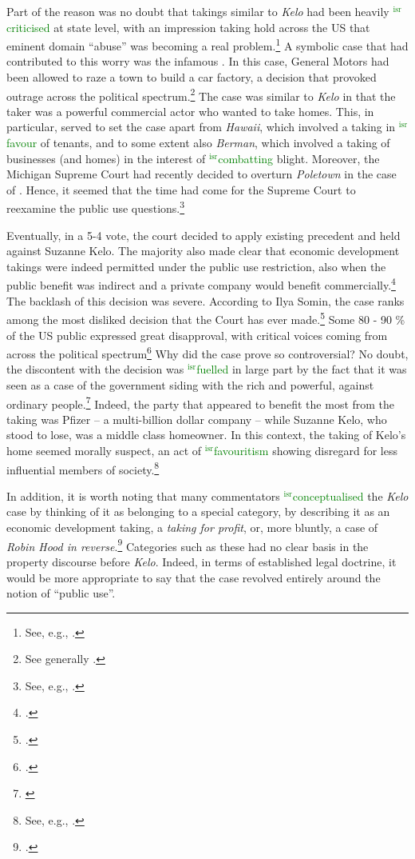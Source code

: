 \documentclass[12pt,a4paper]{book} %
\newcommand{\isr}[1]{\textcolor{green}{$^{\textrm{isr}}${#1}}}
\begin{document}
Part of the reason was no doubt that takings similar to {\it Kelo} had been heavily \isr{criticised} at state level, with an impression taking hold across the US that eminent domain ``abuse'' was becoming a real problem.\footnote{See, e.g., \cite[667-669]{sandefur05}.} A symbolic case that had contributed to this worry was the infamous \textcite{poletown81}. In this case, General Motors had been allowed to raze a town to build a car factory, a decision that provoked outrage across the political spectrum.\footnote{See generally \cite{sandefur05}.} The case was similar to {\it Kelo} in that the taker was a powerful commercial actor who wanted to take homes. This, in particular, served to set the case apart from  {\it Hawaii}, which involved a taking in \isr{favour} of tenants, and to some extent also {\it Berman}, which involved a taking of businesses (and homes) in the interest of \isr{combatting} blight. Moreover, the Michigan Supreme Court had recently decided to overturn {\it Poletown} in the case of \textcite{wayne04}. Hence, it seemed that the time had come for the Supreme Court to reexamine the public use questions.\footnote{See, e.g., \cite{sandefur05,claeys04}.}

Eventually, in a 5-4 vote, the court decided to apply existing precedent and held against Suzanne Kelo. The majority also made clear that economic development takings were indeed permitted under the public use restriction, also when the public benefit was indirect and a private company would benefit commercially.\footcite[469-470]{kelo05} The backlash of this decision was severe. According to Ilya Somin, the case ranks among the most disliked decision that the Court has ever made.\footcite[2]{somin11} Some 80 - 90 \% of the US public expressed great disapproval, with critical voices coming from across the political spectrum\footcite[2108-2110]{somin09} Why did the case prove so controversial? No doubt, the discontent with the decision was \isr{fuelled} in large part by the fact that it was seen as a case of the government siding with the rich and powerful, against ordinary people.\footnote{\cite[630-634]{baron07}} Indeed, the party that appeared to benefit the most from the taking was Pfizer -- a multi-billion dollar company -- while Suzanne Kelo, who stood to lose, was a middle class homeowner. In this context, the taking of Kelo's home seemed morally suspect, an act of \isr{favouritism} showing disregard for less influential members of society.\footnote{See, e.g., \cite{underkuffler06}.}

In addition, it is worth noting that many commentators \isr{conceptualised} the {\it Kelo} case by thinking of it as belonging to a special category, by describing it as an economic development taking, a {\it taking for profit}, or, more bluntly, a case of {\it Robin Hood in reverse}.\footcite{somin05} Categories such as these had no clear basis in the property discourse before {\it Kelo}. Indeed, in terms of established legal doctrine, it would be more appropriate to say that the case revolved entirely around the notion of ``public use''. 
\end{document}
